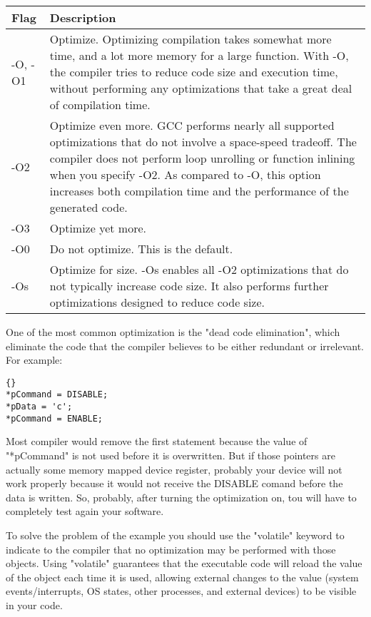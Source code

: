 \documentclass{report}
\begin{document}
\begin{tabular}{|l||p{13cm}|}
\hline
Flag & Description\\
\hline
-O, -O1 &
Optimize. Optimizing compilation takes somewhat more time, and a lot more memory for a large function. With -O, the compiler tries to reduce code size and execution time, without performing any optimizations that take a great deal of compilation time.\\
\hline
-O2 &
Optimize even more. GCC performs nearly all supported optimizations that do not involve a space-speed tradeoff. The compiler does not perform loop unrolling or function inlining when you specify -O2. As compared to -O, this option increases both compilation time and the performance of the generated code.\\ 
\hline
-O3 &
Optimize yet more.\\
\hline
-O0 &
Do not optimize. This is the default.\\ 
\hline
-Os &
Optimize for size. -Os enables all -O2 optimizations that do not typically increase code size. It also performs further optimizations designed to reduce code size.\\
\hline
\end{tabular}
\newline

One of the most common optimization is the "dead code elimination", which eliminate the code that the compiler believes to be either redundant or irrelevant.
For example:
\begin{lstlisting}{}
*pCommand = DISABLE;
*pData = 'c';
*pCommand = ENABLE;
\end{lstlisting}
Most compiler would remove the first statement because the value of "*pCommand" is not used before it is overwritten. But if those pointers are actually some memory mapped device register, probably your device will not work properly because it would not receive the DISABLE comand before the data is written.
So, probably, after turning the optimization on, tou will have to completely test again your software.

To solve the problem of the example you should use the "volatile" keyword to indicate to the compiler that no optimization may be performed with those objects. Using "volatile" guarantees that the executable code will reload the value of the object each time it is used, allowing external changes to the value (system events/interrupts, OS states, other processes, and external devices) to be visible in your code.
\end{document}

